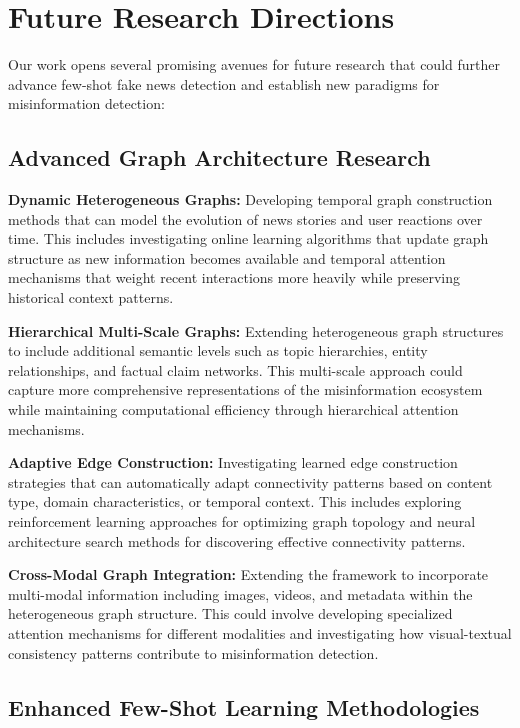 \section{Future Research Directions}

Our work opens several promising avenues for future research that could further advance few-shot fake news detection and establish new paradigms for misinformation detection:

\subsection{Advanced Graph Architecture Research}

\textbf{Dynamic Heterogeneous Graphs:} Developing temporal graph construction methods that can model the evolution of news stories and user reactions over time. This includes investigating online learning algorithms that update graph structure as new information becomes available and temporal attention mechanisms that weight recent interactions more heavily while preserving historical context patterns.

\textbf{Hierarchical Multi-Scale Graphs:} Extending heterogeneous graph structures to include additional semantic levels such as topic hierarchies, entity relationships, and factual claim networks. This multi-scale approach could capture more comprehensive representations of the misinformation ecosystem while maintaining computational efficiency through hierarchical attention mechanisms.

\textbf{Adaptive Edge Construction:} Investigating learned edge construction strategies that can automatically adapt connectivity patterns based on content type, domain characteristics, or temporal context. This includes exploring reinforcement learning approaches for optimizing graph topology and neural architecture search methods for discovering effective connectivity patterns.

\textbf{Cross-Modal Graph Integration:} Extending the framework to incorporate multi-modal information including images, videos, and metadata within the heterogeneous graph structure. This could involve developing specialized attention mechanisms for different modalities and investigating how visual-textual consistency patterns contribute to misinformation detection.

\subsection{Enhanced Few-Shot Learning Methodologies}

